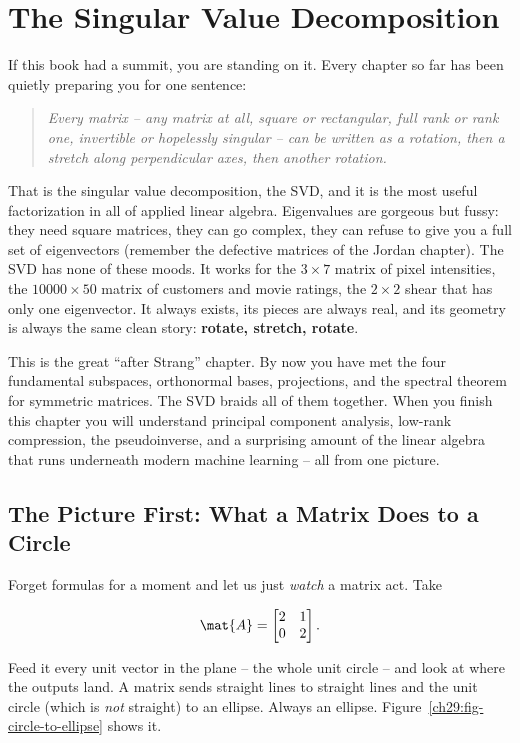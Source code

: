 \chapter{The Singular Value Decomposition}

If this book had a summit, you are standing on it. Every chapter so far has been
quietly preparing you for one sentence:

\begin{quote}
\emph{Every matrix -- any matrix at all, square or rectangular, full rank or
rank one, invertible or hopelessly singular -- can be written as a rotation,
then a stretch along perpendicular axes, then another rotation.}
\end{quote}

That is the singular value decomposition, the SVD, and it is the most useful
factorization in all of applied linear algebra. Eigenvalues are gorgeous but
fussy: they need square matrices, they can go complex, they can refuse to give
you a full set of eigenvectors (remember the defective matrices of the Jordan
chapter). The SVD has none of these moods. It works for the $3\times 7$ matrix
of pixel intensities, the $10000 \times 50$ matrix of customers and movie
ratings, the $2 \times 2$ shear that has only one eigenvector. It always exists,
its pieces are always real, and its geometry is always the same clean story:
\textbf{rotate, stretch, rotate}.

This is the great ``after Strang'' chapter. By now you have met the four
fundamental subspaces, orthonormal bases, projections, and the spectral theorem
for symmetric matrices. The SVD braids all of them together. When you finish
this chapter you will understand principal component analysis, low-rank
compression, the pseudoinverse, and a surprising amount of the linear algebra
that runs underneath modern machine learning -- all from one picture.

\section{The Picture First: What a Matrix Does to a Circle}
\label{ch29:circle-picture}

Forget formulas for a moment and let us just \emph{watch} a matrix act. Take

\[
  \mat{A} = \begin{bmatrix} 2 & 1 \\ 0 & 2 \end{bmatrix}.
\]

Feed it every unit vector in the plane -- the whole unit circle -- and look at
where the outputs land. A matrix sends straight lines to straight lines and the
unit circle (which is \emph{not} straight) to an ellipse. Always an ellipse.
Figure~\ref{ch29:fig-circle-to-ellipse} shows it.

